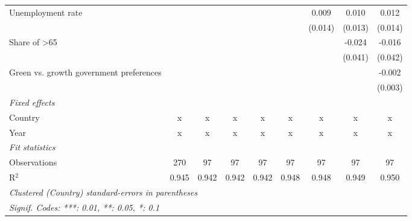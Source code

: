 \begin{table}[htbp]
\begin{tabular}{lcccccccc}
      Unemployment rate                                      &         &              &         &         &         & 0.009   & 0.010   & 0.012\\   
                                                             &         &              &         &         &         & (0.014) & (0.013) & (0.014)\\   
      Share of >65                                           &         &              &         &         &         &         & -0.024  & -0.016\\   
                                                             &         &              &         &         &         &         & (0.041) & (0.042)\\   
      Green vs. growth government preferences                &         &              &         &         &         &         &         & -0.002\\   
                                                             &         &              &         &         &         &         &         & (0.003)\\   
      \emph{Fixed effects}\\
      Country                                                & x       & x            & x       & x       & x       & x       & x       & x\\  
      Year                                                   & x       & x            & x       & x       & x       & x       & x       & x\\  
      \midrule \emph{Fit statistics}\\
      Observations                                           & 270     & 97           & 97      & 97      & 97      & 97      & 97      & 97\\  
      R$^2$                                                  & 0.945   & 0.942        & 0.942   & 0.942   & 0.948   & 0.948   & 0.949   & 0.950\\  
      \midrule
      \multicolumn{9}{l}{\emph{Clustered (Country) standard-errors in parentheses}}\\
      \multicolumn{9}{l}{\emph{Signif. Codes: ***: 0.01, **: 0.05, *: 0.1}}\\
   \end{tabular}
\end{table}



